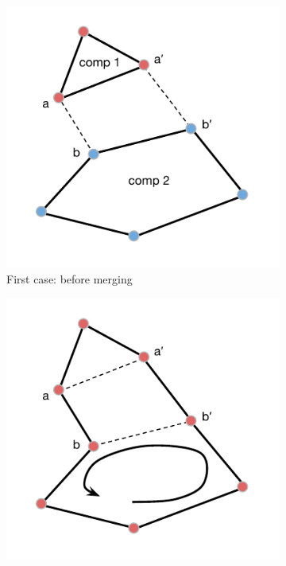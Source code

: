\begin{figure}[h!]
  \centering
  \begin{subfigure}[b]{0.49\linewidth}
    \includegraphics[width=\linewidth]{media/HEU-1__.pdf}
     \caption{First case: before merging}
  \end{subfigure}
  \begin{subfigure}[b]{0.49\linewidth}
    \includegraphics[width=\linewidth]{media/HEU-solved2prova.pdf}

\end{subfigure}
\end{figure}
